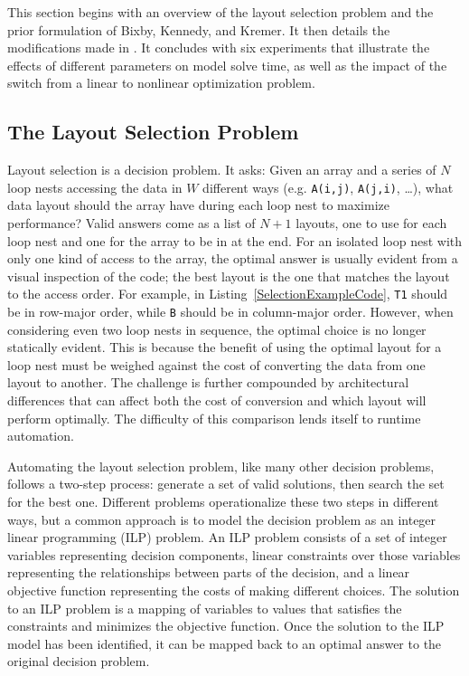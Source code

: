 This section begins with an overview of the layout selection problem and the prior formulation of Bixby, Kennedy, and Kremer.
It then details the modifications made in \FormatDecisions{}.
It concludes with six experiments that illustrate the effects of different parameters on model solve time, as well as the impact of the switch from a linear to nonlinear optimization problem.

\subsection{The Layout Selection Problem}

Layout selection is a decision problem.
It asks: Given an array and a series of $N$ loop nests accessing the data in $W$ different ways (e.g. \verb.A(i,j)., \verb.A(j,i)., \dots), what data layout should the array have during each loop nest to maximize performance?
Valid answers come as a list of $N+1$ layouts, one to use for each loop nest and one for the array to be in at the end.
For an isolated loop nest with only one kind of access to the array, the optimal answer is usually evident from a visual inspection of the code; the best layout is the one that matches the layout to the access order.
For example, in Listing~\ref{SelectionExampleCode}, \verb.T1. should be in row-major order, while \verb.B. should be in column-major order. 
However, when considering even two loop nests in sequence, the optimal choice is no longer statically evident.
This is because the benefit of using the optimal layout for a loop nest must be weighed against the cost of converting the data from one layout to another.
The challenge is further compounded by architectural differences that can affect both the cost of conversion and which layout will perform optimally.
The difficulty of this comparison lends itself to runtime automation.

Automating the layout selection problem, like many other decision problems, follows a two-step process: generate a set of valid solutions, then search the set for the best one.
Different problems operationalize these two steps in different ways, but a common approach is to model the decision problem as an integer linear programming (ILP) problem.
An ILP problem consists of a set of integer variables representing decision components, linear constraints over those variables representing the relationships between parts of the decision, and a linear objective function representing the costs of making different choices.
The solution to an ILP problem is a mapping of variables to values that satisfies the constraints and minimizes the objective function.
Once the solution to the ILP model has been identified, it can be mapped back to an optimal answer to the original decision problem.

